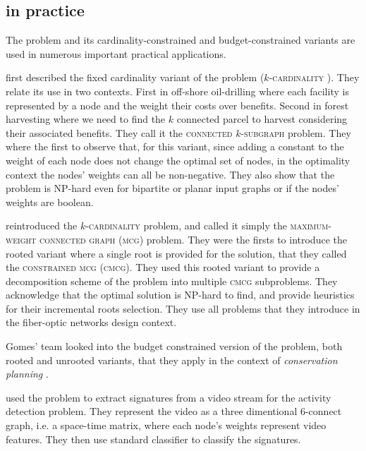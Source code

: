	\subsection{\mwcs{} in practice}

		The \mwcs{} problem and its cardinality-constrained and budget-constrained variants are used in numerous important practical applications.

		\Textcite{hochbaum1994node} first described the fixed cardinality variant of the problem (\textsc{$k$-cardinality \mwcs{}}).
		They relate its use in two contexts.
		First in off-shore oil-drilling where each facility is represented by a node and the weight their costs over benefits.
		Second in forest harvesting where we need to find the $k$ connected parcel to harvest considering their associated benefits.
		They call it the \textsc{connected $k$-subgraph} problem.
		They where the first to observe that, for this variant, since adding a constant to the weight of each node does not change the optimal set of nodes, in the optimality context the nodes' weights can all be non-negative.
		They also show that the problem is NP-hard even for bipartite or planar input graphs or if the nodes' weights are boolean.

		\Textcite{lee1998decomposition} reintroduced the \textsc{$k$-cardinality \mwcs{}} problem, and called it simply the \textsc{maximum-weight connected graph} (\textsc{mcg}) problem.
		They were the firsts to introduce the rooted variant where a single root is provided for the solution, that they called the \textsc{constrained mcg} (\textsc{cmcg}).
		They used this rooted variant to provide a decomposition scheme of the \mwcs{} problem into multiple \textsc{cmcg} subproblems.
		They acknowledge that the optimal solution is NP-hard to find, and provide heuristics for their incremental roots selection.
		They use all problems that they introduce in the fiber-optic networks design context.

		Gomes' team looked into the budget constrained version of the problem, both rooted and unrooted variants, that they apply in the context of \emph{conservation planning} \parencites{conrad2007connections}{gomes2008connections}{dilkina2010solving}.

		\Textcite{chen2012efficient} used the \mwcs{} problem to extract signatures from a video stream for the activity detection problem. They represent the video as a three dimentional 6-connect graph, i.e. a space-time matrix, where each node's weights represent video features. They then use standard classifier to classify the signatures.

